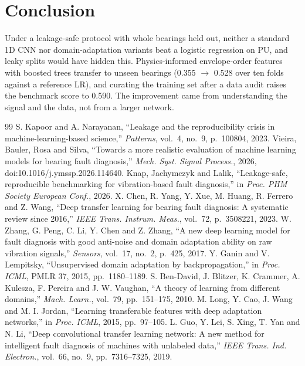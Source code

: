 \documentclass[conference]{IEEEtran}
\begin{document}
\section{Conclusion}
Under a leakage-safe protocol with whole bearings held out, neither a standard 1D CNN nor
domain-adaptation variants beat a logistic regression on PU, and leaky splits would have hidden
this. Physics-informed envelope-order features with boosted trees transfer to unseen bearings
(0.355 $\rightarrow$ 0.528 over ten folds against a reference LR), and curating the training set after a data audit
raises the benchmark score to 0.590. The improvement came from understanding the signal and the
data, not from a larger network.

\begin{thebibliography}{99}
 S. Kapoor and A. Narayanan, ``Leakage and the reproducibility crisis in
machine-learning-based science,'' \emph{Patterns}, vol.~4, no.~9, p.~100804, 2023.
 Vieira, Bauler, Rosa and Silva, ``Towards a more realistic evaluation of
machine learning models for bearing fault diagnosis,'' \emph{Mech. Syst. Signal Process.}, 2026,
doi:10.1016/j.ymssp.2026.114640.
 Knap, Jachymczyk and Lalik, ``Leakage-safe, reproducible benchmarking for
vibration-based fault diagnosis,'' in \emph{Proc. PHM Society European Conf.}, 2026.
 X. Chen, R. Yang, Y. Xue, M. Huang, R. Ferrero and Z. Wang, ``Deep transfer
learning for bearing fault diagnosis: A systematic review since 2016,'' \emph{IEEE Trans.
Instrum. Meas.}, vol.~72, p.~3508221, 2023.
 W. Zhang, G. Peng, C. Li, Y. Chen and Z. Zhang, ``A new deep learning
model for fault diagnosis with good anti-noise and domain adaptation ability on raw vibration
signals,'' \emph{Sensors}, vol.~17, no.~2, p.~425, 2017.
 Y. Ganin and V. Lempitsky, ``Unsupervised domain adaptation by
backpropagation,'' in \emph{Proc. ICML}, PMLR 37, 2015, pp.~1180--1189.
 S. Ben-David, J. Blitzer, K. Crammer, A. Kulesza, F. Pereira and J. W.
Vaughan, ``A theory of learning from different domains,'' \emph{Mach. Learn.}, vol.~79,
pp.~151--175, 2010.
 M. Long, Y. Cao, J. Wang and M. I. Jordan, ``Learning transferable features
with deep adaptation networks,'' in \emph{Proc. ICML}, 2015, pp.~97--105.
 L. Guo, Y. Lei, S. Xing, T. Yan and N. Li, ``Deep convolutional transfer
learning network: A new method for intelligent fault diagnosis of machines with unlabeled
data,'' \emph{IEEE Trans. Ind. Electron.}, vol.~66, no.~9, pp.~7316--7325, 2019.

\end{thebibliography}
\end{document}
